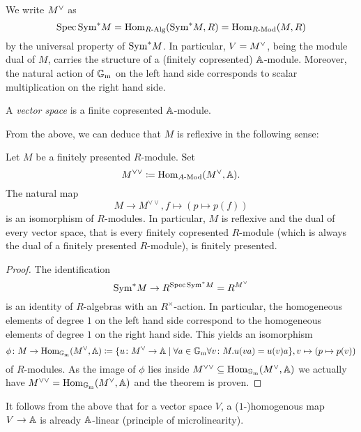 \begin{remark}
  We write $M\spcheck$ as
  \begin{equation*}
    \operatorname{Spec} \mathrm{Sym}^* M = \mathrm{Hom}_{R\text{-}\mathrm{Alg}}(\mathrm{Sym}^* M, R) = \mathrm{Hom}_{R\text{-}\mathrm{Mod}}(M, R)
  \end{equation*}
  by the universal property of $\mathrm{Sym}^* M$.  In particular,
  $V = M\spcheck$, being the module dual of $M$, carries the structure
  of a (finitely copresented) $\mathbb{A}$-module.  Moreover, the natural
  action of $\mathbb{G}_\mathrm{m}$ on the left hand side corresponds to scalar
  multiplication on the right hand side.
\end{remark}

\begin{definition}
  A \emph{vector space} is a finite copresented $\mathbb{A}$-module.
\end{definition}

From the above, we can deduce that $M$ is reflexive in the following
sense:

\begin{theorem}
  Let $M$ be a finitely presented $R$-module.  Set
  \begin{equation*}
    M^{\vee\vee} \coloneqq \Hom_{\Mod A}(M\spcheck, \A).
  \end{equation*}
  The natural map
  \begin{equation*}
    M \to M^{\vee\vee}, f \mapsto (p \mapsto p(f))
  \end{equation*}
  is an isomorphism of $R$-modules.  In particular, $M$ is reflexive
  and the dual of every vector space, that is every finitely
  copresented $R$-module (which is always the dual of a finitely
  presented $R$-module), is finitely presented.
\end{theorem}

\begin{proof}
  The identification
  \begin{equation*}
    \Sym^* M \to R^{\Spec \Sym^* M} = R^{M\spcheck}
  \end{equation*}
  is an identity of $R$-algebras with an $R^\times$-action.  In
  particular, the homogeneous elements of degree $1$ on the left hand
  side correspond to the homogeneous elements of degree $1$ on the
  right hand side.  This yields an isomorphism
  \begin{equation*}
    \phi\colon M \to \Hom_{\Gm}(M\spcheck, \A) \coloneqq \{u\colon M\spcheck \to \A \mid \forall a \in \Gm\forall v\colon M. u(v a) = u(v) a\},
    v \mapsto (p \mapsto p(v))
  \end{equation*}
  of $R$-modules.  As the image of $\phi$ lies inside
  $M^{\vee\vee} \subseteq \Hom_{\Gm}(M\spcheck, \A)$ we actually have
  $M^{\vee\vee} = \Hom_{\Gm}(M\spcheck, \A)$ and the theorem is
  proven.
\end{proof}

\begin{remark}
  It follows from the above that for a vector space $V$, a
  ($1$-)homogenous map $V \to \mathbb{A}$ is already $\mathbb{A}$-linear (principle of
  microlinearity).
\end{remark}

